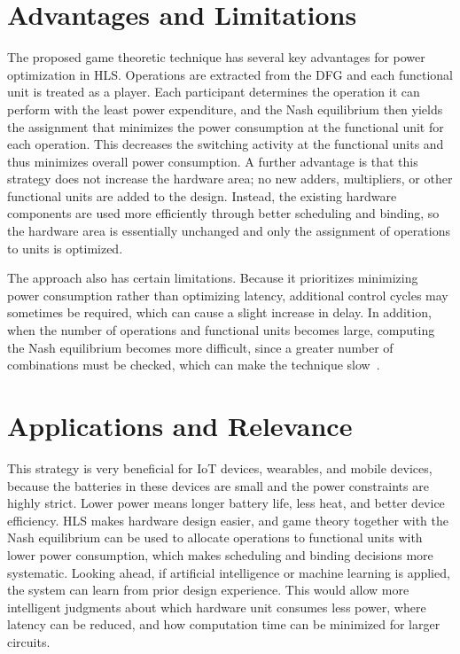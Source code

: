\documentclass[conference]{IEEEtran}
\begin{document}
\section{Advantages and Limitations}

The proposed game theoretic technique has several key advantages for
power optimization in HLS. Operations are extracted from the DFG and
each functional unit is treated as a player. Each participant
determines the operation it can perform with the least power
expenditure, and the Nash equilibrium then yields the assignment that
minimizes the power consumption at the functional unit for each
operation. This decreases the switching activity at the functional
units and thus minimizes overall power consumption. A further advantage
is that this strategy does not increase the hardware area; no new
adders, multipliers, or other functional units are added to the design.
Instead, the existing hardware components are used more efficiently
through better scheduling and binding, so the hardware area is
essentially unchanged and only the assignment of operations to units is
optimized.

The approach also has certain limitations. Because it prioritizes
minimizing power consumption rather than optimizing latency, additional
control cycles may sometimes be required, which can cause a slight
increase in delay. In addition, when the number of operations and
functional units becomes large, computing the Nash equilibrium becomes
more difficult, since a greater number of combinations must be checked,
which can make the technique slow~\cite{murugavel2003}.

\section{Applications and Relevance}

This strategy is very beneficial for IoT devices, wearables, and mobile
devices, because the batteries in these devices are small and the power
constraints are highly strict. Lower power means longer battery life,
less heat, and better device efficiency. HLS makes hardware design
easier, and game theory together with the Nash equilibrium can be used
to allocate operations to functional units with lower power
consumption, which makes scheduling and binding decisions more
systematic. Looking ahead, if artificial intelligence or machine
learning is applied, the system can learn from prior design experience.
This would allow more intelligent judgments about which hardware unit
consumes less power, where latency can be reduced, and how computation
time can be minimized for larger circuits.
\end{document}
